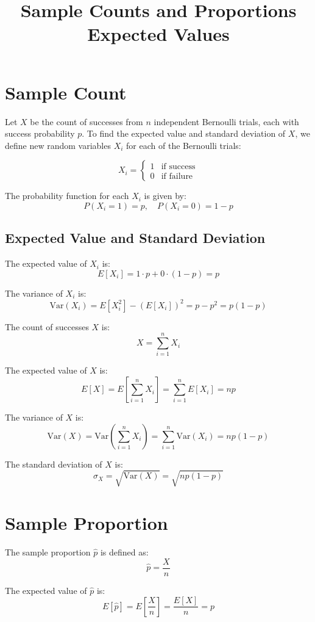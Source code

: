 \documentclass{article}
\begin{document}
\title{Sample Counts and Proportions Expected Values}
\author{}
\date{}
\maketitle

\section{Sample Count}
Let \( X \) be the count of successes from \( n \) independent Bernoulli trials, each with success probability \( p \). To find the expected value and standard deviation of \( X \), we define new random variables \( X_i \) for each of the Bernoulli trials:

\[
X_i =
\begin{cases}
1 & \text{if success} \\
0 & \text{if failure}
\end{cases}
\]

The probability function for each \( X_i \) is given by:
\[
P(X_i = 1) = p, \quad P(X_i = 0) = 1 - p
\]

\subsection{Expected Value and Standard Deviation}
The expected value of \( X_i \) is:
\[
E[X_i] = 1 \cdot p + 0 \cdot (1 - p) = p
\]

The variance of \( X_i \) is:
\[
\text{Var}(X_i) = E[X_i^2] - (E[X_i])^2 = p - p^2 = p(1 - p)
\]

The count of successes \( X \) is:
\[
X = \sum_{i=1}^n X_i
\]

The expected value of \( X \) is:
\[
E[X] = E\left[\sum_{i=1}^n X_i\right] = \sum_{i=1}^n E[X_i] = np
\]

The variance of \( X \) is:
\[
\text{Var}(X) = \text{Var}\left(\sum_{i=1}^n X_i\right) = \sum_{i=1}^n \text{Var}(X_i) = np(1 - p)
\]

The standard deviation of \( X \) is:
\[
\sigma_X = \sqrt{\text{Var}(X)} = \sqrt{np(1 - p)}
\]

\section{Sample Proportion}
The sample proportion \( \hat{p} \) is defined as:
\[
\hat{p} = \frac{X}{n}
\]

The expected value of \( \hat{p} \) is:
\[
E[\hat{p}] = E\left[\frac{X}{n}\right] = \frac{E[X]}{n} = p
\]
\end{document}

